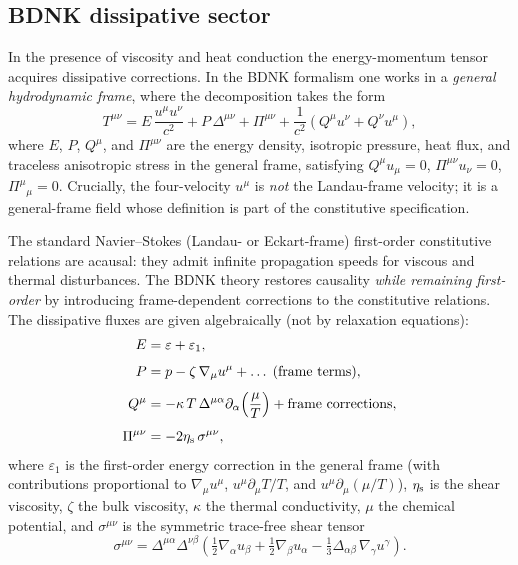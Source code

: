 \subsection{BDNK dissipative sector}
\label{sec:rel-1-2b}

In the presence of viscosity and heat conduction the energy-momentum
tensor acquires dissipative corrections.  In the BDNK formalism one
works in a \emph{general hydrodynamic frame}, where the decomposition
takes the form
\begin{equation}
\label{eq:rel-1-6}
T^{\mu\nu} = E\,\frac{u^{\mu}u^{\nu}}{c^{2}}
  + P\,\Delta^{\mu\nu}
  + \Pi^{\mu\nu}
  + \frac{1}{c^{2}}(Q^{\mu}u^{\nu}+Q^{\nu}u^{\mu}),
\end{equation}
where $E$, $P$, $Q^{\mu}$, and $\Pi^{\mu\nu}$ are the energy density,
isotropic pressure, heat flux, and traceless anisotropic stress in the
general frame, satisfying $Q^{\mu}u_{\mu}=0$,
$\Pi^{\mu\nu}u_{\nu}=0$, $\Pi^{\mu}{}_{\mu}=0$.  Crucially, the
four-velocity $u^{\mu}$ is \emph{not} the Landau-frame velocity; it
is a general-frame field whose definition is part of the constitutive
specification.

The standard Navier--Stokes (Landau- or Eckart-frame) first-order
constitutive relations are acausal: they admit infinite propagation
speeds for viscous and thermal disturbances.  The BDNK theory
\cite{BemficaDN2018,Kovtun2019} restores causality \emph{while
remaining first-order} by introducing frame-dependent corrections to
the constitutive relations.  The dissipative fluxes are given
algebraically (not by relaxation equations):
\begin{align}
E &= \varepsilon + \varepsilon_{1},
\label{eq:rel-1-7}\\[4pt]
P &= p - \zeta\,\nabla_{\mu}u^{\mu} + \ldots\;(\text{frame terms}),
\label{eq:rel-1-8}\\[4pt]
Q^{\mu} &= -\kappa\,T\,\Delta^{\mu\alpha}\partial_{\alpha}
  \!\left(\frac{\mu}{T}\right)
  + \text{frame corrections},
\label{eq:rel-1-9}\\[4pt]
\Pi^{\mu\nu} &= -2\eta_{\rm s}\,\sigma^{\mu\nu},
\label{eq:rel-1-9b}
\end{align}
where $\varepsilon_{1}$ is the first-order energy correction in the
general frame (with contributions proportional to $\nabla_{\mu}u^{\mu}$,
$u^{\mu}\partial_{\mu}T/T$, and $u^{\mu}\partial_{\mu}(\mu/T)$),
$\eta_{\rm s}$ is the shear viscosity, $\zeta$ the bulk viscosity,
$\kappa$ the thermal conductivity, $\mu$ the chemical potential, and
$\sigma^{\mu\nu}$ is the symmetric trace-free shear tensor
\begin{equation}
\label{eq:rel-1-10}
\sigma^{\mu\nu} = \Delta^{\mu\alpha}\Delta^{\nu\beta}
  \!\left(\tfrac{1}{2}\nabla_{\alpha}u_{\beta}
        +\tfrac{1}{2}\nabla_{\beta}u_{\alpha}
        -\tfrac{1}{3}\Delta_{\alpha\beta}\,\nabla_{\gamma}u^{\gamma}
  \right).
\end{equation}

